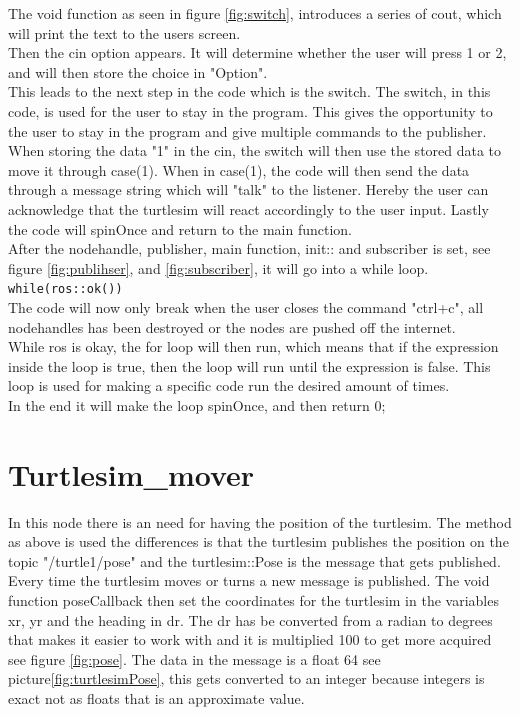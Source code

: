The void function as seen in figure \ref{fig:switch}, introduces a series of cout, which will print the text to the users screen.\\
Then the cin option appears. It will determine whether the user will press 1 or 2, and will then store the choice in "Option".\\
This leads to the next step in the code which is the switch. The switch, in this code, is used for the user to stay in the program. This gives the opportunity to the user to stay in the program and give multiple commands to the publisher.\\
When storing the data "1" in the cin, the switch will then use the stored data to move it through case(1). When in case(1), the code will then send the data through a message string which will "talk" to the listener. Hereby the user can acknowledge that the turtlesim will react accordingly to the user input. Lastly the code will spinOnce and return to the main function.\\
After the nodehandle, publisher, main function, init:: and subscriber is set, see figure \ref{fig:publihser}, and \ref{fig:subscriber}, it will go into a while loop.\\
\texttt{while(ros::ok())}\\
The code will now only break when the user closes the command "ctrl+c", all nodehandles has been destroyed or the nodes are pushed off the internet.\\
While ros is okay, the for loop will then run, which means that if the expression inside the loop is true, then the loop will run until the expression is false. This loop is used for making a specific code run the desired amount of times.\\
In the end it will make the loop spinOnce, and then return 0;\\

\section{Turtlesim\_mover}

In this node there is an need for having the position of the turtlesim. The method as above is used the differences is that the turtlesim publishes the position on the topic "/turtle1/pose" and the turtlesim::Pose is the message that gets published. Every time the turtlesim moves or turns a new message is published. The void function poseCallback then set the coordinates for the turtlesim in the variables xr, yr and the heading in dr. The dr has be converted from a radian to degrees that makes it easier to work with and it is multiplied 100 to get more acquired see figure \ref{fig:pose}. The data in the message is a float 64 see picture\ref{fig:turtlesimPose}, this gets converted to an integer because integers is exact not as floats that is an approximate value.\\

